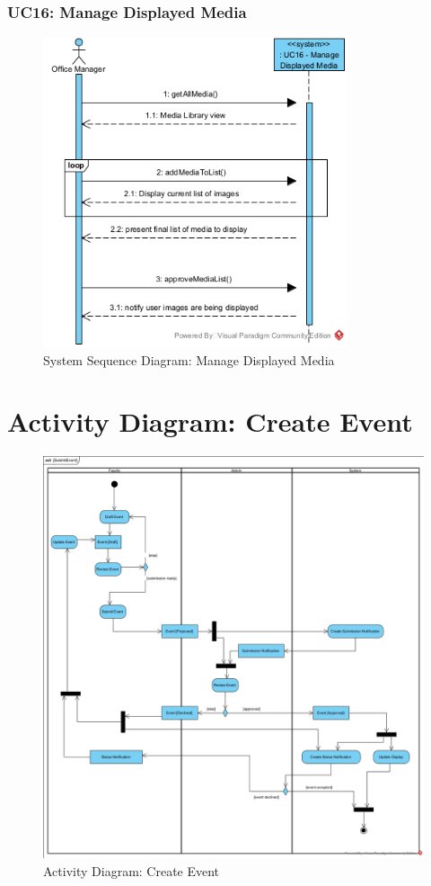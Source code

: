 \documentclass{article}
\begin{document}
\subsubsection{UC16: Manage Displayed Media}
\begin{figure}[H]
    \centering
    \includegraphics[width=0.8\textwidth]{images/SSD-UC16-ManageDisplayedMedia.png}
    \centering
    \caption{System Sequence Diagram: Manage Displayed Media}
\end{figure}
\section{Activity Diagram: Create Event}
\begin{figure}[H]
    \centering
    \includegraphics[width=.98\textwidth]{images/SubmitEvent.png}
    \centering
    \caption{Activity Diagram: Create Event}
    \label{fig:activityDiagram}
\end{figure}
\end{document}

